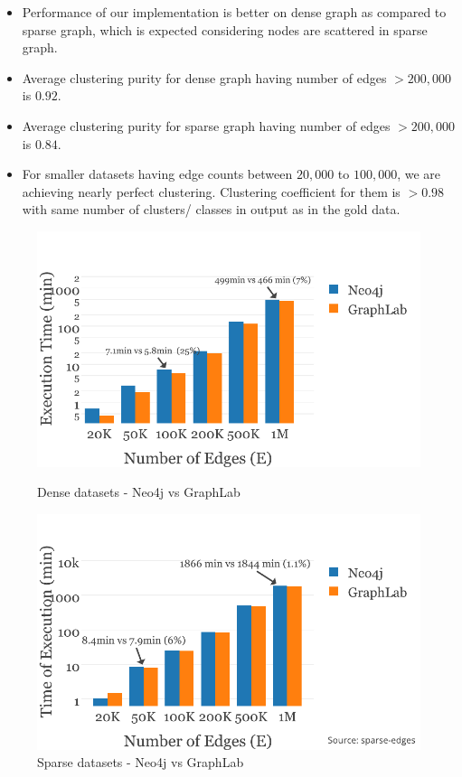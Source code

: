 \begin{itemize}
\item Performance of our implementation is better on dense graph as compared to sparse graph, which is expected considering nodes are scattered in sparse graph.
\item Average clustering purity for dense graph having number of edges $> 200,000$ is $0.92$.
\item Average clustering purity for sparse graph having number of edges $> 200,000$ is $0.84$.
\item For smaller datasets having edge counts between $20,000$ to $100,000$, we are achieving nearly perfect clustering. Clustering coefficient for them is $>0.98$ with same number of clusters/ classes in output as in the gold data.
\end{itemize}

	\begin{figure}
		\begin{minipage}{.5\textwidth}
			\centering
			\includegraphics[scale=0.5]{Graphs/dense-edges.pdf}
			\caption{Dense datasets - Neo4j vs GraphLab\label{fig:dense-edges}}
		\end{minipage}
		\begin{minipage}{.5\textwidth}
			\centering
			\includegraphics[scale=0.5]{Graphs/sparse-edges.pdf}
			\caption{Sparse datasets - Neo4j vs GraphLab\label{fig:sparse-edges}}
		\end{minipage}
	\end{figure}
	
